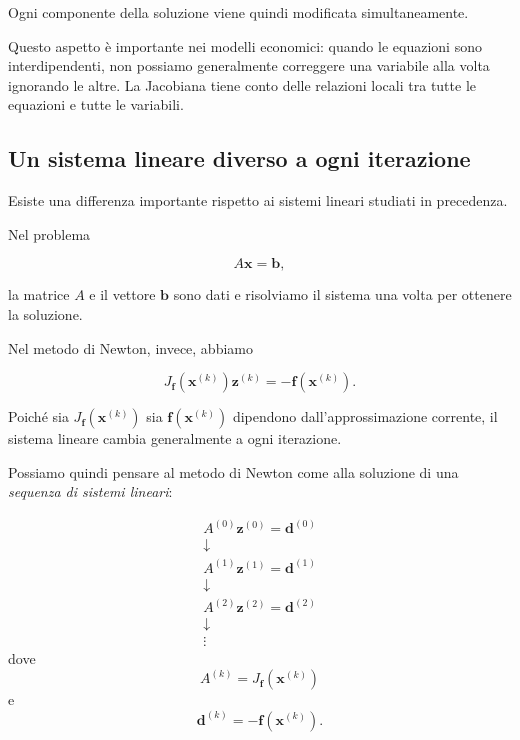 Ogni componente della soluzione viene quindi modificata
simultaneamente.

Questo aspetto è importante nei modelli economici: quando le
equazioni sono interdipendenti, non possiamo generalmente correggere
una variabile alla volta ignorando le altre. La Jacobiana tiene conto
delle relazioni locali tra tutte le equazioni e tutte le variabili.


\subsection{Un sistema lineare diverso a ogni iterazione}

Esiste una differenza importante rispetto ai sistemi lineari studiati
in precedenza.

Nel problema

\begin{equation*}
    A\mathbf{x}=\mathbf{b},
\end{equation*}

la matrice $A$ e il vettore $\mathbf{b}$ sono dati e risolviamo il
sistema una volta per ottenere la soluzione.

Nel metodo di Newton, invece, abbiamo

\begin{equation*}
    J_{\mathbf{f}}(\mathbf{x}^{(k)})
    \mathbf{z}^{(k)}
    =
    -\mathbf{f}(\mathbf{x}^{(k)}).
\end{equation*}

Poiché sia $J_{\mathbf{f}}(\mathbf{x}^{(k)})$ sia
$\mathbf{f}(\mathbf{x}^{(k)})$ dipendono dall'approssimazione corrente, il sistema lineare cambia
generalmente a ogni iterazione.

Possiamo quindi pensare al metodo di Newton come alla soluzione di
una \emph{sequenza di sistemi lineari}:

\begin{equation*}
\boxed{
\begin{array}{c}
A^{(0)}\mathbf{z}^{(0)}=\mathbf{d}^{(0)}\\
\downarrow\\
A^{(1)}\mathbf{z}^{(1)}=\mathbf{d}^{(1)}\\
\downarrow\\
A^{(2)}\mathbf{z}^{(2)}=\mathbf{d}^{(2)}\\
\downarrow\\
\vdots
\end{array}}
\end{equation*}
dove
\begin{equation*}
    A^{(k)}
    =
    J_{\mathbf{f}}(\mathbf{x}^{(k)})
\end{equation*}
e
\begin{equation*}
    \mathbf{d}^{(k)}
    =
    -\mathbf{f}(\mathbf{x}^{(k)}).
\end{equation*}

